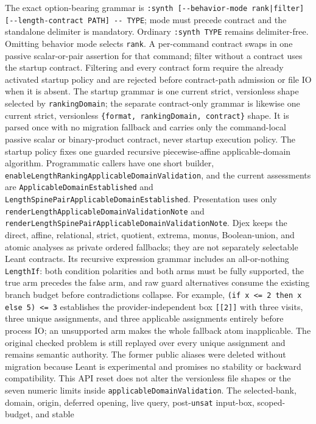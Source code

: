 \documentclass[11pt,oneside]{article}
\newcommand{\code}[1]{\texttt{#1}}
\begin{document}
The exact option-bearing grammar is
\code{:synth [-{}-behavior-mode rank|filter]
[-{}-length-contract PATH] -{}- TYPE}; mode must precede contract and the
standalone delimiter is mandatory. Ordinary \code{:synth TYPE} remains
delimiter-free. Omitting behavior mode selects \code{rank}. A per-command
contract swaps in one passive scalar-or-pair assertion for that command;
filter without a contract uses the startup contract. Filtering and every
contract form require the already activated startup policy and are rejected
before contract-path admission or file IO when it is absent. The
startup grammar is one current strict, versionless shape selected by
\code{rankingDomain}; the separate contract-only grammar is likewise one
current strict, versionless \code{\{format, rankingDomain, contract\}} shape.
It is parsed once with no migration fallback and carries only the command-local
passive scalar or binary-product contract, never startup execution policy. The
startup policy fixes one guarded recursive piecewise-affine applicable-domain
algorithm. Programmatic callers have one short builder,
\nolinkurl{enableLengthRankingApplicableDomainValidation}, and the current
assessments are \code{ApplicableDomainEstablished} and
\nolinkurl{LengthSpinePairApplicableDomainEstablished}. Presentation uses only
\nolinkurl{renderLengthApplicableDomainValidationNote} and
\nolinkurl{renderLengthSpinePairApplicableDomainValidationNote}. Djex keeps the
direct, affine, relational,
strict, quotient, extrema, monus, Boolean-union, and atomic analyses as private
ordered fallbacks; they are not separately selectable Leant contracts. Its
recursive expression grammar includes an all-or-nothing \code{LengthIf}:
both condition polarities and both arms must be fully supported, the true arm
precedes the false arm, and raw guard alternatives consume the existing branch
budget before contradictions collapse. For example,
\code{(if x <= 2 then x else 5) <= 3} establishes the provider-independent
box \code{[[2]]} with three visits, three unique assignments, and three
applicable assignments entirely before process IO; an unsupported arm makes
the whole fallback atom inapplicable. The original checked problem is still
replayed over every unique assignment and remains semantic authority. The
former public aliases were deleted without migration because Leant is
experimental and promises no stability or backward compatibility. This API
reset does not alter the versionless file shapes or the seven numeric limits
inside \code{applicableDomainValidation}. The selected-bank, domain, origin, deferred
opening, live query, post-\code{unsat} input-box, scoped-budget, and stable
\end{document}
